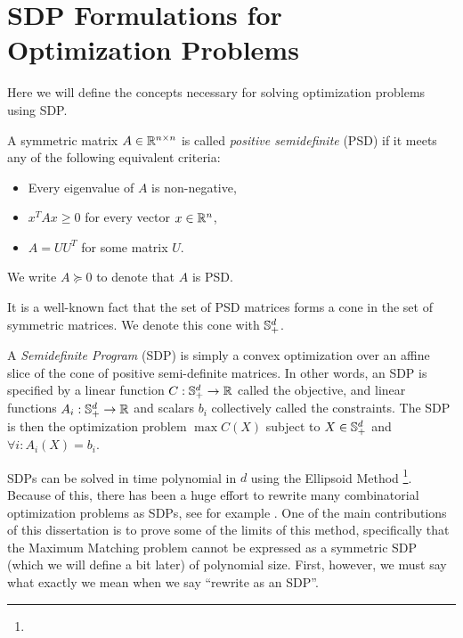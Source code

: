 \section{SDP Formulations for Optimization Problems}
Here we will define the concepts necessary for solving optimization problems using SDP.
\begin{definition}
A symmetric matrix $A \in \mathbb R^{n \times n}$ is called \emph{positive semidefinite} (PSD) if it meets any of the following equivalent criteria:
\begin{itemize}
\item Every eigenvalue of $A$ is non-negative,
\item $x^TAx \geq 0$ for every vector $x \in \mathbb R^n$,
\item $A = UU^T$ for some matrix $U$.
\end{itemize}
We write $A \succeq 0$ to denote that $A$ is PSD. 
\end{definition}
It is a well-known fact that the set of PSD matrices forms a cone in the set of symmetric matrices. We denote this cone with $\mathbb{S}^{d}_+$.
\begin{definition}
A \emph{Semidefinite Program} (SDP) is simply a convex optimization over an affine slice of the cone of positive semi-definite matrices. In other words, an SDP is
specified by a linear function $C: \mathbb{S}^{d}_+ \rightarrow \mathbb R$ called the objective, and linear functions $A_i: \mathbb{S}^{d}_+ \rightarrow \mathbb R$ and scalars $b_i$ 
collectively called the constraints. The SDP is then the optimization problem $\max C(X)$ subject to $X \in \mathbb{S}^{d}_+$ and $\forall i: A_i(X) = b_i$.
\end{definition}
SDPs can be solved in time polynomial in $d$ using the Ellipsoid Method \cite{}\footnote{}. Because of this, there has been a huge effort to rewrite many combinatorial
optimization problems as SDPs, see for example \cite{}. One of the main contributions of this dissertation is to prove some of the limits of this method, specifically
that the Maximum Matching problem cannot be expressed as a symmetric SDP (which we will define a bit later) of polynomial size. First, however, we must say what exactly we mean when we say "`rewrite as an SDP"'.
